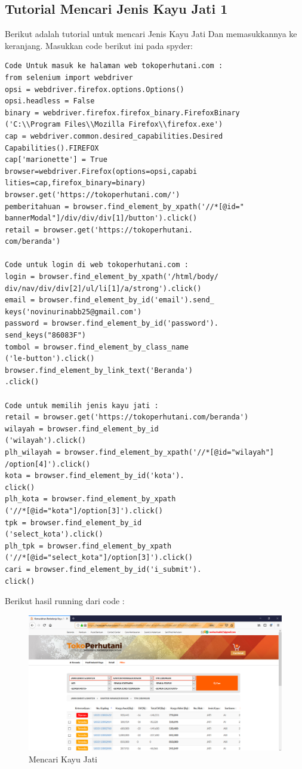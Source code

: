 \subsection{Tutorial Mencari Jenis Kayu Jati 1}
Berikut adalah tutorial untuk mencari Jenis Kayu Jati Dan memasukkannya ke keranjang. Masukkan code berikut ini pada spyder:
\begin{verbatim}
Code Untuk masuk ke halaman web tokoperhutani.com :
from selenium import webdriver
opsi = webdriver.firefox.options.Options()
opsi.headless = False
binary = webdriver.firefox.firefox_binary.FirefoxBinary
('C:\\Program Files\\Mozilla Firefox\\firefox.exe')
cap = webdriver.common.desired_capabilities.Desired
Capabilities().FIREFOX
cap['marionette'] = True
browser=webdriver.Firefox(options=opsi,capabi
lities=cap,firefox_binary=binary)
browser.get('https://tokoperhutani.com/')
pemberitahuan = browser.find_element_by_xpath('//*[@id="
bannerModal"]/div/div/div[1]/button').click()
retail = browser.get('https://tokoperhutani.
com/beranda')

Code untuk login di web tokoperhutani.com :
login = browser.find_element_by_xpath('/html/body/
div/nav/div/div[2]/ul/li[1]/a/strong').click()
email = browser.find_element_by_id('email').send_
keys('novinurinabb25@gmail.com')
password = browser.find_element_by_id('password').
send_keys("86083F")
tombol = browser.find_element_by_class_name
('le-button').click()
browser.find_element_by_link_text('Beranda')
.click()

Code untuk memilih jenis kayu jati :
retail = browser.get('https://tokoperhutani.com/beranda')
wilayah = browser.find_element_by_id
('wilayah').click()
plh_wilayah = browser.find_element_by_xpath('//*[@id="wilayah"]
/option[4]').click()
kota = browser.find_element_by_id('kota').
click()
plh_kota = browser.find_element_by_xpath
('//*[@id="kota"]/option[3]').click()
tpk = browser.find_element_by_id
('select_kota').click()
plh_tpk = browser.find_element_by_xpath
('//*[@id="select_kota"]/option[3]').click()
cari = browser.find_element_by_id('i_submit').
click()
\end{verbatim}

Berikut hasil running dari code :
\begin{figure}[h]
	\centering
	\includegraphics[scale=0.25]{figures/jatii}
	\caption{Mencari Kayu Jati}
\end{figure}


